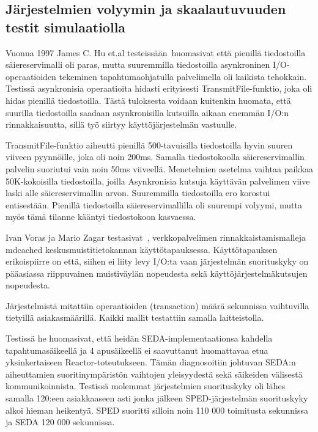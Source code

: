 \documentclass[finnish]{tktltiki2}
\theoremstyle{definition}
\theoremstyle{remark}
\begin{document}
\subsection{Järjestelmien volyymin ja skaalautuvuuden testit simulaatiolla}
Vuonna 1997 James C. Hu et.al testeissään~\cite{hu_measuring_1997}huomasivat
että pienillä tiedostoilla säiereservimalli oli paras,
mutta suuremmilla tiedostoilla asynkroninen I/O-operaatioiden
tekeminen tapahtumaohjatulla palvelimella oli kaikista tehokkain.
Testissä asynkronisia operaatioita hidasti
erityisesti TransmitFile-funktio, joka oli
hidas pienillä tiedostoilla.
Tästä tuloksesta voidaan kuitenkin huomata,
että suurilla tiedostoilla saadaan asynkronisilla
kutsuilla aikaan enemmän I/O:n rinnakkaisuutta, sillä
työ siirtyy käyttöjärjestelmän vastuulle.

TransmitFile-funktio aiheutti pienillä 500-tavuisilla tiedostoilla hyvin suuren viiveen
pyynnöille, joka oli noin 200ms. Samalla tiedostokoolla säiereservimallin palvelin
suoriutui vain noin 50ms viiveellä. Menetelmien asetelma vaihtaa paikkaa
50K-kokoisilla tiedostoilla, joilla Asynkronisia kutsuja käyttävän
palvelimen viive laski alle säiereservimallin arvon. Suuremmilla tiedostoilla
ero korostui entisestään. Pienillä tiedostoilla säiereservimallilla oli suurempi
volyymi, mutta myös tämä tilanne kääntyi tiedostokoon kasvaessa.


Ivan Voras ja Mario Zagar testasivat~\cite{voras_characteristics_2009},
verkkopalvelimen rinnakkaistamismalleja mdcached keskusmuistitietokannan
käyttötapauksessa. Käyttötapauksen erikoispiirre on että, siihen ei liity levy I/O:ta
vaan järjestelmän suorituskyky on pääasiassa riippuvainen muistiväylän nopeudesta sekä
käyttöjärjestelmäkutsujen nopeudesta.

Järjestelmistä mitattiin operaatioiden (transaction) määrä sekunnissa vaihtuvilla tietyillä
asiakasmäärillä. Kaikki mallit testattiin samalla laitteistolla.

Testissä he huomasivat,
että heidän SEDA-implementaationsa kahdella tapahtumasäikeellä ja 4 apusäikeellä
ei saavuttanut huomattavaa
etua yksinkertaiseen Reactor-toteutukseen. Tämän diagnosoitiin
johtuvan SEDA:n aiheuttamien suoritinympäristön vaihtojen yleisyydestä 
sekä säikeiden välisestä kommunikoinnista.
Testissä molemmat järjestelmien suorituskyky
oli lähes samalla 120:een asiakkaaseen asti jonka
jälkeen SPED-järjestelmän suorituskyky alkoi
hieman heikentyä. SPED suoritti silloin noin 110 000 toimitusta sekunnissa
ja SEDA 120 000 sekunnissa.
\end{document}
